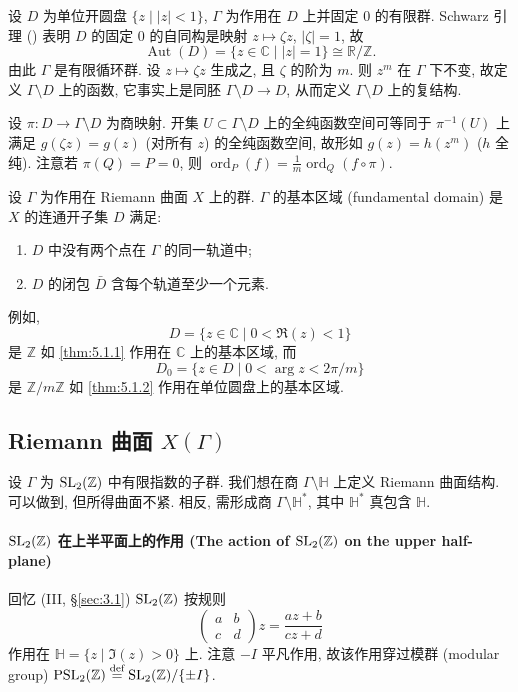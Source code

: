 \begin{example} \label{thm:5.1.2} 
设 $D$ 为单位开圆盘 $\{z \mid |z| < 1\}$, $\Gamma$ 为作用在 $D$ 上并固定 $0$ 的有限群. Schwarz 引理 (\cite[III, 3]{cartan1963}) 表明 $D$ 的固定 $0$ 的自同构是映射 $z\mapsto\zeta z$, $|\zeta| = 1$, 故
\[
\operatorname{Aut}(D) = \{z\in\mathbb{C} \mid |z| = 1\}\cong\mathbb{R}/\mathbb{Z}.
\]
由此 $\Gamma$ 是有限循环群. 设 $z\mapsto\zeta z$ 生成之, 且 $\zeta$ 的阶为 $m$. 则 $z^m$ 在 $\Gamma$ 下不变, 故定义 $\Gamma\setminus D$ 上的函数, 它事实上是同胚 $\Gamma\setminus D\to D$, 从而定义 $\Gamma\setminus D$ 上的复结构.

设 $\pi\colon D\to\Gamma\setminus D$ 为商映射. 开集 $U\subset\Gamma\setminus D$ 上的全纯函数空间可等同于 $\pi^{-1}(U)$ 上满足 $g(\zeta z) = g(z)$ (对所有 $z$) 的全纯函数空间, 故形如 $g(z) = h(z^m)$ ($h$ 全纯). 注意若 $\pi(Q) = P = 0$, 则 $\operatorname{ord}_P(f) = \frac{1}{m}\operatorname{ord}_Q(f\circ\pi)$.
\end{example}

设 $\Gamma$ 为作用在 Riemann 曲面 $X$ 上的群. $\Gamma$ 的基本区域 (fundamental domain) 是 $X$ 的连通开子集 $D$ 满足:
\begin{enumerate}[label=\textup{(\alph*)}]
\item $D$ 中没有两个点在 $\Gamma$ 的同一轨道中;
\item $D$ 的闭包 $\bar{D}$ 含每个轨道至少一个元素.
\end{enumerate}
例如,
\[
D = \{z\in\mathbb{C} \mid 0 < \Re(z) < 1\}
\]
是 $\mathbb{Z}$ 如 \ref{thm:5.1.1} 作用在 $\mathbb{C}$ 上的基本区域, 而
\[
D_0 = \{z\in D \mid 0 < \arg z < 2\pi/m\}
\]
是 $\mathbb{Z}/m\mathbb{Z}$ 如 \ref{thm:5.1.2} 作用在单位圆盘上的基本区域.

\subsection*{Riemann 曲面 $X(\Gamma)$}

设 $\Gamma$ 为 $\operatorname{SL}_2(\mathbb{Z})$ 中有限指数的子群. 我们想在商 $\Gamma\setminus\mathbb{H}$ 上定义 Riemann 曲面结构. 可以做到, 但所得曲面不紧. 相反, 需形成商 $\Gamma\setminus\mathbb{H}^*$, 其中 $\mathbb{H}^*$ 真包含 $\mathbb{H}$.

\paragraph{$\operatorname{SL}_2(\mathbb{Z})$ 在上半平面上的作用 (The action of $\operatorname{SL}_2(\mathbb{Z})$ on the upper half-plane)}
回忆 (III, \S\ref{sec:3.1}) $\operatorname{SL}_2(\mathbb{Z})$ 按规则
\[
\begin{pmatrix}a & b\\ c & d\end{pmatrix}z = \frac{az+b}{cz+d}
\]
作用在 $\mathbb{H} = \{z \mid \Im(z) > 0\}$ 上. 注意 $-I$ 平凡作用, 故该作用穿过模群 (modular group) $\operatorname{PSL}_2(\mathbb{Z}) \overset{\text{def}}{=} \operatorname{SL}_2(\mathbb{Z})/\{\pm I\}$.

